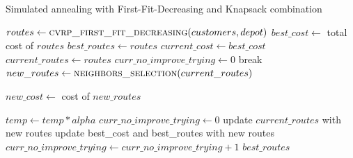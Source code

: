 \documentclass[12pt]{article}
\begin{document}
\begin{algorithm}[!h]
    \small
    \caption{Simulated annealing with First-Fit-Decreasing and Knapsack combination}
    \label{alg:alg_sa}
    
    \begin{algorithmic}[1]
        
        
        \State $routes \gets \textsc{cvrp\_first\_fit\_decreasing}(customers,depot)$
        \State $best\_cost \gets$ total cost of $routes$
        \State $best\_routes \gets routes$
        \State $current\_cost \gets best\_cost$
        \State $current\_routes \gets routes$
        \State $curr\_no\_improve\_trying \gets 0$
        break
        \EndIf
        \State $new\_routes \gets \textsc{neighbors\_selection}(current\_routes)$
        
        \State $new\_cost \gets$ cost of $new\_routes$
        
        \State $temp \gets temp * alpha$
        \State $curr\_no\_improve\_trying \gets 0$
        \State update $current\_routes$ with new routes
        \State update best\_cost and best\_routes with new routes
        \EndIf
        \Else
        \State $curr\_no\_improve\_trying \gets curr\_no\_improve\_trying + 1$
        \EndIf
        \EndWhile
        \Return $best\_routes$
        \EndFunction
    \end{algorithmic}
\end{algorithm}
\end{document}
